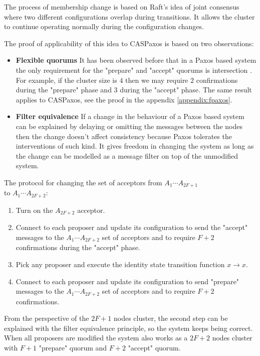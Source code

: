 \documentclass[12pt]{article}
\theoremstyle{definition}
\begin{document}
The process of membership change is based on Raft's idea of joint consensus where two different configurations overlap during transitions. It allows the cluster to continue operating normally during the configuration changes.

The proof of applicability of this idea to CASPaxos is based on two observations:

\begin{itemize}
  \item {\bf Flexible quorums} It has been observed before that in a Paxos based system the only requirement for the "prepare" and "accept" quorums is intersection \cite{abcds}\cite{vertical}\cite{fpaxos}. For example, if the cluster size is $4$ then we may require $2$ confirmations during the "prepare" phase and $3$ during the "accept" phase. The same result applies to CASPaxos, see the proof in the appendix \ref{appendix:fpaxos}.
  
  \item {\bf Filter equivalence} If a change in the behaviour of a Paxos based system can be explained by delaying or omitting the messages between the nodes then the change doesn't affect consistency because Paxos tolerates the interventions of such kind. It gives freedom in changing the system as long as the change can be modelled as a message filter on top of the unmodified system.
\end{itemize}

The protocol for changing the set of acceptors from $A_1 \cdots A_{2F+1}$ \\
to $A_1 \cdots A_{2F+2}$:
\begin{enumerate}
  \item Turn on the $A_{2F+2}$ acceptor.
  \item Connect to each proposer and update its configuration to send the "accept" messages to the $A_1 \cdots A_{2F+2}$ set of acceptors and to require $F+2$ confirmations during the "accept" phase.
  \item Pick any proposer and execute the identity state transition function $x \to x$.
  \item Connect to each proposer and update its configuration to send "prepare" messages to the $A_1 \cdots A_{2F+2}$ set of acceptors and to require $F+2$ confirmations.
\end{enumerate}

From the perspective of the $2F+1$ nodes cluster, the second step can be explained with the filter equivalence principle, so the system keeps being correct. When all proposers are modified the system also works as a $2F+2$ nodes cluster with $F+1$ "prepare" quorum and $F+2$ "accept" quorum.
\end{document}
